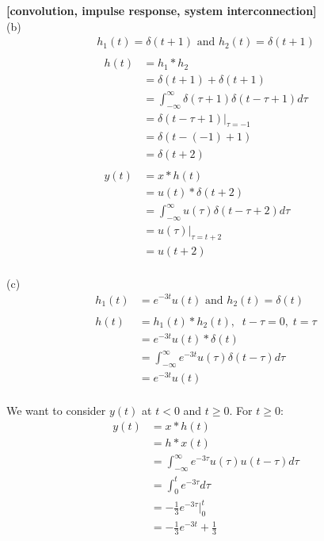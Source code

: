 \documentclass{article}
\begin{document}
 {\bf [convolution, impulse response, system interconnection]}\\
(b)\\
\begin{equation*}
\begin{split}
    h_1(t) = \delta(t + 1) \text{ and } h_2(t) = \delta(t + 1)\\
\end{split}
\end{equation*}
\begin{equation*}
\begin{split}
    h(t) &= h_1 * h_2\\
    &= \delta (t + 1) + \delta(t + 1)\\
    &= \int_{-\infty}^{\infty} \delta(\tau + 1) \delta(t - \tau + 1)d \tau\\
    &= \delta(t - \tau + 1)\big|_{\tau = -1}\\
    &= \delta(t - (-1) + 1)\\
    &= \delta(t + 2)\\\\
    y(t) &= x * h(t)\\
    &= u(t) * \delta(t + 2)\\
    &=  \int_{-\infty}^{\infty} u(\tau) \delta(t - \tau + 2)d\tau\\
    &= u(\tau)\big|_{\tau = t + 2}\\
    &= u(t + 2)\\
\end{split}
\end{equation*}

(c)\\
\begin{equation*}
\begin{split}
    h_1(t) &= e^{-3t}u(t) \text{ and } h_2(t) = \delta(t)\\\\
    h(t) &= h_1(t) * h_2(t), \;\; t - \tau = 0, \; t = \tau\\
    &= e^{-3t}u(t) * \delta(t)\\
    &= \int_{-\infty}^{\infty} e^{-3t}u(\tau) \delta(t - \tau)d\tau\\
    &= e^{-3t}u(t)\\
\end{split}
\end{equation*}

We want to consider $y(t)$ at  $t < 0$ and $t \geq 0$. For $t \geq 0$:
\begin{equation*}
\begin{split}
    y(t) &= x * h(t)\\
    &= h * x(t)\\
    &= \int_{-\infty}^{\infty} e^{-3\tau}u(\tau) u(t - \tau)d\tau\\
    &= \int_{0}^{t} e^{-3\tau}d\tau\\
    &= -\frac{1}{3}e^{-3\tau}\big|_0^t\\
    &= -\frac{1}{3}e^{-3t} + \frac{1}{3}\\
\end{split}
\end{equation*}
\end{document}
